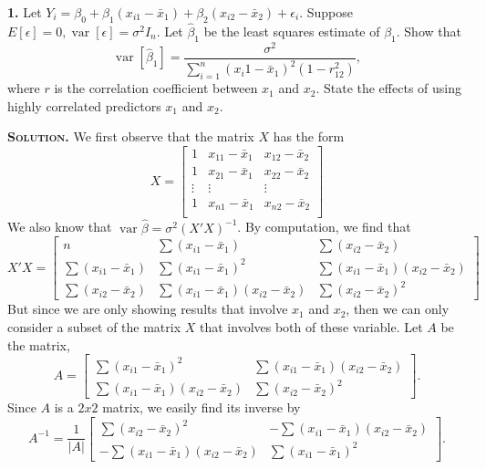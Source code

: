 \documentclass{article}
\newcommand{\Var}{\operatorname{Var}} %
\newcommand{\var}{\operatorname{var}} %
\begin{document}
\setlength{\parindent}{0cm}   %



\textbf{1.} Let \(Y_i =\beta_0 + \beta_1(x_{i1}-\bar x_1) + \beta_2(x_{i2}-\bar x_2) + \epsilon_i\). Suppose \(E[\epsilon]=0, \var[\epsilon]=\sigma^2 I_n\). Let \(\hat \beta_1\) be the least squares estimate of \(\beta_1\).  Show that \[
\var[\hat \beta_1] = \frac{\sigma^2}{\sum_{i=1}^{n}(x_i1 -\bar x_1)^2(1-r_{12}^2) },
\]where \(r\) is the correlation coefficient between \(x_1\) and \(x_2\). 
State the effects of using highly correlated predictors \(x_1\) and \(x_2\). 

\vspace{4mm} 
\textbf{\textsc{Solution.}} We first observe that the matrix \(X\) has the form 
\[
X = \begin{bmatrix}
1& x_{11} -\bar x_1 & x_{12} -\bar x_2 \\
1& x_{21} -\bar x_1 & x_{22} -\bar x_2 \\
\vdots& \vdots & \vdots \\
1& x_{n1} -\bar x_1 & x_{n2} -\bar x_2 \\
\end{bmatrix}
\]
We also know that \(\var{\hat \beta} = \sigma^2 (X'X)^{-1} \). By computation, we find that 
\[
X'X =  \begin{bmatrix}
n & \sum (x_{i1} -\bar x_1) &  \sum (x_{i2} -\bar x_2) \\
 \sum (x_{i1} -\bar x_1)& \sum(x_{i1}-\bar x_1)^2   & \sum (x_{i1} -\bar x_1)( x_{i2} -\bar x_2) \\
  \sum (x_{i2} -\bar x_2) &\sum (x_{i1} -\bar x_1)( x_{i2} -\bar x_2)   & \sum(x_{i2}-\bar x_2)^2
\end{bmatrix}
\]
But since we are only showing results that involve \(x_1\) and \(x_2\), then we can only consider a subset of the matrix \(X\) that involves both of these variable. Let \(A\) be the matrix,
\[
A =  \begin{bmatrix}
 \sum(x_{i1}-\bar x_1)^2   & \sum (x_{i1} -\bar x_1)( x_{i2} -\bar x_2) \\
\sum (x_{i1} -\bar x_1)( x_{i2} -\bar x_2)   & \sum(x_{i2}-\bar x_2)^2
\end{bmatrix}.
\]
Since \(A\) is a \(2 x 2\) matrix, we easily find its inverse by
\[
A^{-1} = 
\frac{1}{|A|}
 \begin{bmatrix}
 \sum(x_{i2}-\bar x_2)^2   &- \sum (x_{i1} -\bar x_1)( x_{i2} -\bar x_2) \\
-\sum (x_{i1} -\bar x_1)( x_{i2} -\bar x_2)   & \sum(x_{i1}-\bar x_1)^2
\end{bmatrix}.
\]
\end{document}

